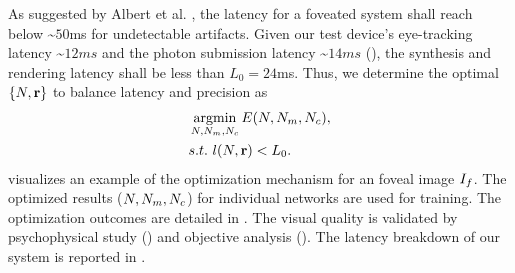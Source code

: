 As suggested by Albert et al. , the latency for a foveated system shall reach below \textasciitilde$50$ms for undetectable artifacts. Given our test device's eye-tracking latency \textasciitilde$12ms$ and the photon submission latency \textasciitilde$14ms$ (\cite{albert2017latency}), the synthesis and rendering latency shall be less than $L_0 = 24$ms.
Thus, we determine the optimal $\{N, \mathbf{r}\}$ to balance latency and precision as
\begin{equation}
\begin{aligned}
    &\argmin_{\sphereNum, \mlpLayerNum, \mlpChannelNum} \finalError(\sphereNum, \mlpLayerNum, \mlpChannelNum), \\
    & s.t.\ {l(\sphereNum, \mathbf{\sphereRadius})} < L_0.
\end{aligned}
\end{equation}
 visualizes an example of the optimization mechanism for an foveal image $I_{f}$. The optimized results ($N, N_{m}, N_{c}$) for individual networks are used for training. The optimization outcomes are detailed in .
The visual quality is validated by psychophysical study () and objective analysis (). The latency breakdown of our system is reported in .
